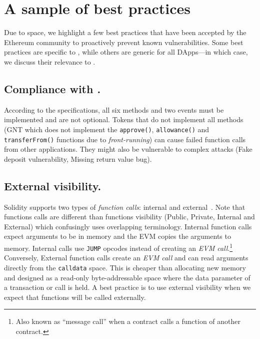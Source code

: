 
\section{A sample of best practices}\label{sec:bp}

Due to space, we highlight a few best practices that have been accepted by the Ethereum community to proactively prevent known vulnerabilities\cite{TokenBP}. Some best practices are specific to \erc, while others are generic for all DApps---in which case, we discuss their relevance to \erc.

\subsection{Compliance with \erc.}\label{subsec:compl}

According to the \erc specifications, all six methods and two events must be implemented and are not optional. Tokens that do not implement all methods (\eg GNT which does not implement the \texttt{approve()}, \texttt{allowance()} and \texttt{transferFrom()} functions due to \textit{front-running}\cite{GNT}) can cause failed function calls from other applications. They might also be vulnerable to complex attacks (\eg Fake deposit vulnerability\cite{DEPOSafe}, Missing return value bug\cite{ErcBug}).

\subsection{External visibility.}\label{subsec:external}

Solidity supports two types of \textit{function calls}: internal and external~\cite{SolidityDoc}. Note that functions calls are different than functions visibility (\ie Public, Private, Internal and External) which confusingly uses overlapping terminology. Internal function calls expect arguments to be in memory and the EVM copies the arguments to memory. Internal calls use \texttt{JUMP} opcodes instead of creating an \textit{EVM call}.\footnote{Also known as ``message call'' when a contract calls a function of another contract.} Conversely, External function calls create an \textit{EVM call} and can read arguments directly from the \texttt{calldata} space. This is cheaper than allocating new memory and designed as a read-only byte-addressable space where the data parameter of a transaction or call is held\cite{EthInDepth}. A best practice is to use external visibility when we expect that functions will be called externally.

